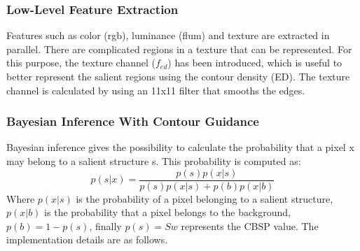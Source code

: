 \subsubsection{Low-Level Feature Extraction}
Features such as color (rgb), luminance (flum) and texture are extracted in 
parallel. There are complicated regions in a texture that can be represented. 
For this purpose, the texture channel ($ {f_{ed}} $)  has been introduced, which is 
useful to better represent the salient regions using the contour density (ED). 
The texture channel is calculated by using an 11x11 filter that smooths the 
edges.

\subsubsection{Bayesian Inference With Contour Guidance}
Bayesian inference gives the possibility to calculate the probability that a 
pixel x may belong to a salient structure s. This probability is computed as:
$$ p(s|x) = \frac{p(s)p(x|s)}{p(s)p(x|s)+p(b)p(x|b) } $$
Where $ p(x|s) $ is the probability of a pixel belonging to a salient structure, 
$ p(x|b) $ is the probability that a pixel belongs to the background, $ p(b)=1-p(s) $,
finally $ p(s)=Sw $ represents the CBSP value. The implementation 
details are as follows.
